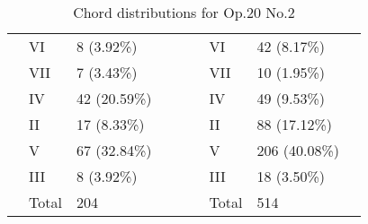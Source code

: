 \begin{table}[]
{\begin{tabular}{|l|l|l|l|l|l|l|l|l|}
 & VI & 8 (3.92\%) &  &  &  & VI & 42 (8.17\%) &  \\ \cline{2-3} \cline{7-8}
 & VII & 7 (3.43\%) &  &  &  & VII & 10 (1.95\%) &  \\ \cline{2-3} \cline{7-8}
 & IV & 42 (20.59\%) &  &  &  & IV & 49 (9.53\%) &  \\ \cline{2-3} \cline{7-8}
 & II & 17 (8.33\%) &  &  &  & II & 88 (17.12\%) &  \\ \cline{2-3} \cline{7-8}
 & V & 67 (32.84\%) &  &  &  & V & 206 (40.08\%) &  \\ \cline{2-3} \cline{7-8}
 & III & 8 (3.92\%) &  &  &  & III & 18 (3.50\%) &  \\ \cline{2-3} \cline{7-8}
 & Total & 204 &  &  &  & Total & 514 &  \\ \cline{1-4} \cline{6-9}
\end{tabular}
}
\caption{Chord distributions for Op.20 No.2}
\label{table:chords_op20n2}
\end{table}

